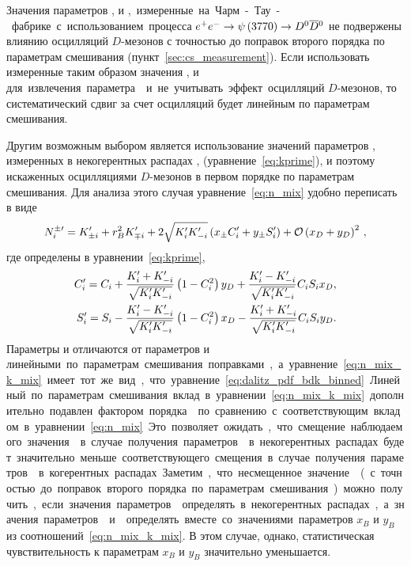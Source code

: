 Значения параметров \ki, \ci и \si, измеренные на Чарм-Тау-фабрике с использованием процесса $e^+e^-\to\psi\left(3770\right)\to D^0\overline{D}{}^0$ не подвержены влиянию осцилляций $D$-мезонов с точностью до поправок второго порядка по параметрам смешивания (пункт~\ref{sec:cs_measurement}).  Если использовать измеренные таким образом значения \ki, \ci и \si для извлечения параметра~\gphi и не учитывать эффект осцилляций $D$-мезонов, то систематический сдвиг за счет осцилляций будет линейным по параметрам смешивания.

Другим возможным выбором является использование значений параметров \ki, измеренных в некогерентных распадах \dstpdpip, \dnkpp (уравнение~\eqref{eq:kprime}), и поэтому искаженных осцилляциями $D$-мезонов в первом порядке по параметрам смешивания.  Для анализа этого случая уравнение~\eqref{eq:n_mix} удобно переписать в виде~\cite{mixing}
\begin{equation}\label{eq:n_mix_k_mix}
  N^{\pm\prime}_i = 
    K^{\prime}_{\pm i} + r_B^2K^{\prime}_{\mp i} + 2\sqrt{K_i^{\prime}K_{-i}^{\prime}}\left( x_{\pm}C_i^{\prime}+y_{\pm} S_i^{\prime}\right)+\mathcal{O}\left(x_D+y_D\right)^2
  \,, 
\end{equation}
где \kipr определены в уравнении~\eqref{eq:kprime},
\begin{equation}
\begin{split}
  C_i^{\prime} = C_i & + \frac{K_i^{\prime}+K_{-i}^{\prime}}{\sqrt{K_i^{\prime}K_{-i}^{\prime}}} \left( 1-C_i^2\right) y_D
               + \frac{K_i^{\prime}-K_{-i}^{\prime}}{\sqrt{K_i^{\prime}K_{-i}^{\prime}}} C_iS_i x_D, \\
  S_i^{\prime} = S_i & - \frac{K_i^{\prime}-K_{-i}^{\prime}}{\sqrt{K_i^{\prime}K_{-i}^{\prime}}} \left( 1-C_i^2\right) x_D
               - \frac{K_i^{\prime}+K_{-i}^{\prime}}{\sqrt{K_i^{\prime}K_{-i}^{\prime}}} C_iS_i y_D.
\end{split}
\end{equation}
Параметры \cipr и \sipr отличаются от параметров \ci и \si линейными по параметрам смешивания поправками, а уравнение~\eqref{eq:n_mix_k_mix} имеет тот же вид, что уравнение~\eqref{eq:dalitz_pdf_bdk_binned}.  Линейный по параметрам смешивания вклад в уравнении~\eqref{eq:n_mix_k_mix} дополнительно подавлен фактором порядка \rb по сравнению с соответствующим вкладом в уравнении~\eqref{eq:n_mix}.  Это позволяет ожидать, что смещение наблюдаемого значения \gphi в случае получения параметров \ki в некогерентных распадах будет значительно меньше соответствующего смещения в случае получения параметров \ki в когерентных распадах.

Заметим, что несмещенное значение \gphi (с точностью до поправок второго порядка по параметрам смешивания) можно получить, если значения параметров \ki определять в некогерентных распадах, а значения параметров \cipr и \sipr определять вместе со значениями параметров $x_B$ и $y_B$ из соотношений~\eqref{eq:n_mix_k_mix}.  В этом случае, однако, статистическая чувствительность к параметрам $x_B$ и $y_B$ значительно уменьшается.  

